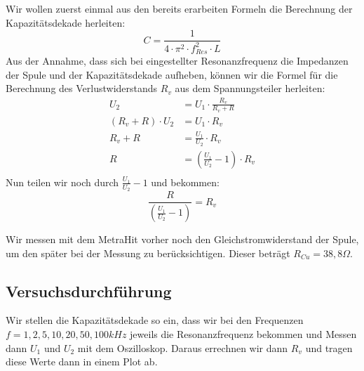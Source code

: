 \documentclass{article}
\begin{document}
Wir wollen zuerst einmal aus den bereits erarbeiten Formeln die Berechnung der Kapazitätsdekade herleiten:
\begin{equation}
  C = \frac{1}{4\cdot\pi^2\cdot f_{Res}^2 \cdot L}
\end{equation}
Aus der Annahme, dass sich bei eingestellter Resonanzfrequenz die Impedanzen der Spule und der Kapazitätsdekade aufheben, können wir die Formel
für die Berechnung des Verlustwiderstands $R_v$ aus dem Spannungsteiler herleiten:
\begin{align*}
  U_2                           & = U_1 \cdot \frac{R_v}{R_v+R}                \\
  \left(R_v + R\right)\cdot U_2 & = U_1 \cdot R_v                              \\
  R_v + R                       & = \frac{U_1}{U_2} \cdot R_v                  \\
  R                             & = \left(\frac{U_1}{U_2} - 1\right) \cdot R_v \\
\end{align*}
Nun teilen wir noch durch $\frac{U_1}{U_2} - 1$ und bekommen:
\begin{equation}
  \frac{R}{\left(\frac{U_1}{U_2} - 1\right)}  = R_v
\end{equation}

Wir messen mit dem MetraHit vorher noch den Gleichstromwiderstand der Spule, um den später bei der Messung zu berücksichtigen.
Dieser beträgt $R_{Cu} = 38,8\Omega$.

\subsection{Versuchsdurchführung}

Wir stellen die Kapazitätsdekade so ein, dass wir bei den Frequenzen $f = 1,2,5,10,20,50,100kHz$ jeweils die Resonanzfrequenz bekommen und Messen dann
$U_1$ und $U_2$ mit dem Oszilloskop. Daraus errechnen wir dann $R_v$ und tragen diese Werte dann in einem Plot ab.
\end{document}
